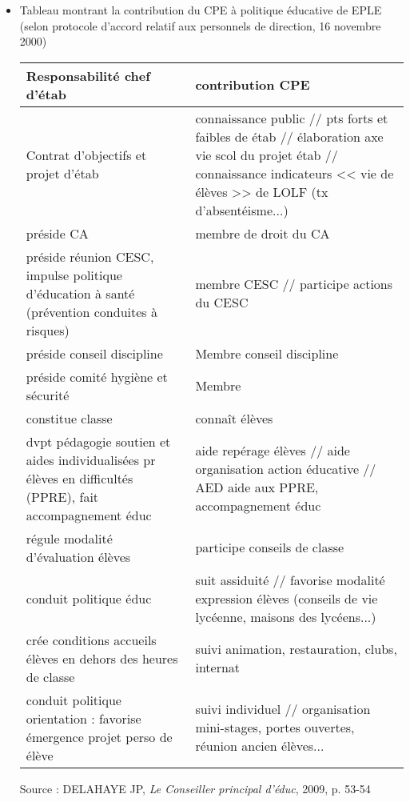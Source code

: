 \documentclass[12pt]{report}
\begin{document}
\begin{itemize}
\item Tableau montrant la contribution du CPE à politique éducative de EPLE (selon protocole d'accord relatif aux personnels de direction, 16 novembre 2000) \\
\begin{tabular}{|p{8cm}|p{8cm}|}
\hline Responsabilité chef d'étab & contribution CPE \\ 
\hline Contrat d'objectifs et projet d'étab & connaissance public // pts forts et faibles de étab // élaboration axe vie scol du projet étab // connaissance indicateurs << vie de élèves >> de LOLF (tx d'absentéisme...) \\ 
\hline préside CA & membre de droit du CA \\ 
\hline préside réunion CESC, impulse politique d'éducation à santé (prévention conduites à risques) & membre CESC // participe actions du CESC \\ 
\hline préside conseil discipline & Membre conseil discipline \\ 
\hline préside comité hygiène et sécurité & Membre \\ 
\hline constitue classe & connaît élèves \\ 
\hline dvpt pédagogie soutien et aides individualisées pr élèves en difficultés (PPRE), fait accompagnement éduc & aide repérage élèves // aide organisation action éducative // AED aide aux PPRE, accompagnement éduc \\ 
\hline régule modalité d'évaluation élèves & participe conseils de classe \\ 
\hline conduit politique éduc & suit assiduité // favorise modalité expression élèves (conseils de vie lycéenne, maisons des lycéens...) \\ 
\hline crée conditions accueils élèves en dehors des heures de classe & suivi animation, restauration, clubs, internat \\ 
\hline conduit politique orientation : favorise émergence projet perso de élève & suivi individuel // organisation mini-stages, portes ouvertes, réunion ancien élèves... \\ 
\hline 
\end{tabular} 

\begin{flushright}
Source : DELAHAYE JP, \textit{Le Conseiller principal d'éduc}, 2009, p. 53-54
\end{flushright}



\end{itemize}
\end{document}
